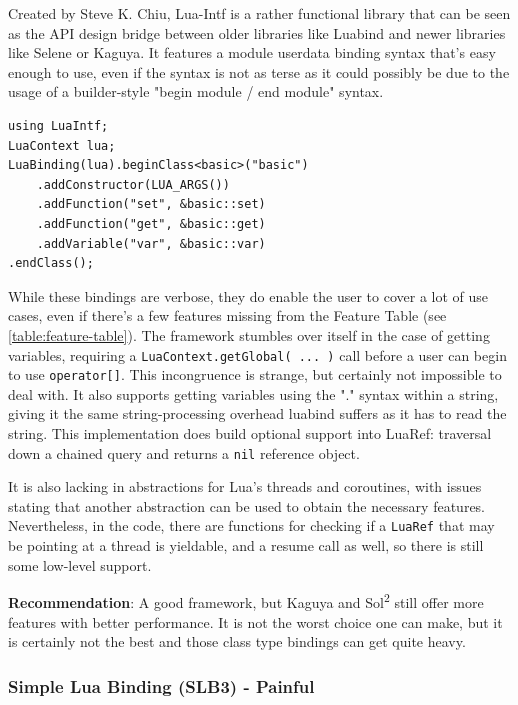 \documentclass[conference,compsoc]{IEEEtran}
\newcommand{\soltwo}{Sol\textsuperscript{2}}
\begin{document}
Created by Steve K. Chiu, Lua-Intf\cite{lua-intf} is a rather functional library that can be seen as the API design bridge between older libraries like Luabind and newer libraries like Selene or Kaguya. It features a module userdata binding syntax that's easy enough to use, even if the syntax is not as terse as it could possibly be due to the usage of a builder-style "begin module / end module" syntax.

\begin{lstlisting}[caption={Binding the basic example from \cref{lst:basic-code}} in Lua-Intf,
label={lst:lua-intf-binding}]
using LuaIntf;
LuaContext lua;
LuaBinding(lua).beginClass<basic>("basic")
	.addConstructor(LUA_ARGS())
	.addFunction("set", &basic::set)
	.addFunction("get", &basic::get)
	.addVariable("var", &basic::var)
.endClass();
\end{lstlisting}

While these bindings are verbose, they do enable the user to cover a lot of use cases, even if there's a few features missing from the Feature Table (see \cref{table:feature-table}). The framework stumbles over itself in the case of getting variables, requiring a \lstinline|LuaContext.getGlobal( ... )| call before a user can begin to use \lstinline|operator[]|. This incongruence is strange, but certainly not impossible to deal with. It also supports getting variables using the "." syntax within a string, giving it the same string-processing overhead luabind suffers as it has to read the string. This implementation does build optional support into LuaRef: traversal down a chained query and returns a \lstinline|nil| reference object.

It is also lacking in abstractions for Lua's threads and coroutines, with issues stating that another abstraction can be used to obtain the necessary features. Nevertheless, in the code, there are functions for checking if a \lstinline|LuaRef| that may be pointing at a thread is yieldable, and a resume call as well, so there is still some low-level support.

\textbf{Recommendation}: A good framework, but Kaguya and \soltwo{} still offer more features with better performance. It is not the worst choice one can make, but it is certainly not the best and those class type bindings can get quite heavy.

\subsubsection{Simple Lua Binding (SLB3) - Painful}
\end{document}
